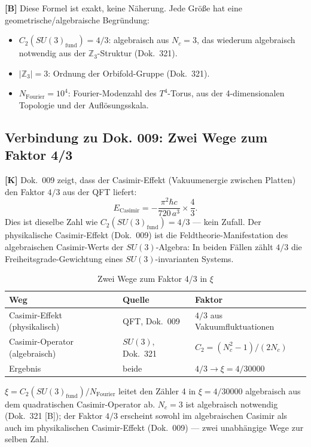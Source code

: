 \textbf{[B]} Diese Formel ist exakt, keine Näherung.
Jede Größe hat eine geometrische/algebraische Begründung:
\begin{itemize}
  \item $C_2(SU(3)_{\text{fund}}) = 4/3$: algebraisch aus $N_c = 3$,
    das wiederum algebraisch notwendig aus der $\mathbb{Z}_3$-Struktur
    (Dok.~321).
  \item $|\mathbb{Z}_3| = 3$: Ordnung der Orbifold-Gruppe (Dok.~321).
  \item $N_{\text{Fourier}} = 10^4$: Fourier-Modenzahl des $T^4$-Torus,
    aus der 4-dimensionalen Topologie und der Auflösungsskala.
\end{itemize}

\subsection{Verbindung zu Dok. 009: Zwei Wege zum Faktor 4/3}

\textbf{[K]} Dok.~009 zeigt, dass der Casimir-Effekt (Vakuumenergie
zwischen Platten) den Faktor $4/3$ aus der QFT liefert:
\begin{equation}
  E_{\text{Casimir}} = -\frac{\pi^2\hbar c}{720\,a^3}\times\frac{4}{3}.
  \label{eq:casimir_eff}
\end{equation}
Dies ist dieselbe Zahl wie $C_2(SU(3)_{\text{fund}}) = 4/3$ — kein Zufall.
Der physikalische Casimir-Effekt (Dok.~009) ist die
Feldtheorie-Manifestation des algebraischen Casimir-Werts der
$SU(3)$-Algebra: In beiden Fällen zählt $4/3$ die
Freiheitsgrade-Gewichtung eines $SU(3)$-invarianten Systems.

\begin{table}[h]
\centering
\caption{Zwei Wege zum Faktor 4/3 in $\xi$}
\label{tab:casimir_wege}
\begin{tabular}{lll}
\toprule
Weg & Quelle & Faktor \\
\midrule
Casimir-Effekt (physikalisch) & QFT, Dok.~009 & $4/3$ aus Vakuumfluktuationen \\
Casimir-Operator (algebraisch) & $SU(3)$, Dok.~321 & $C_2 = (N_c^2-1)/(2N_c)$ \\
\midrule
Ergebnis & beide & $4/3 \to \xi = 4/30000$ \\
\bottomrule
\end{tabular}
\end{table}

\begin{keyresult}
$\xi = C_2(SU(3)_{\text{fund}})/N_{\text{Fourier}}$ leitet den
Zähler 4 in $\xi = 4/30000$ algebraisch aus dem quadratischen
Casimir-Operator ab. $N_c = 3$ ist algebraisch notwendig (Dok.~321 [B]);
der Faktor $4/3$ erscheint sowohl im algebraischen Casimir als auch
im physikalischen Casimir-Effekt (Dok.~009) — zwei unabhängige
Wege zur selben Zahl.
\end{keyresult}


